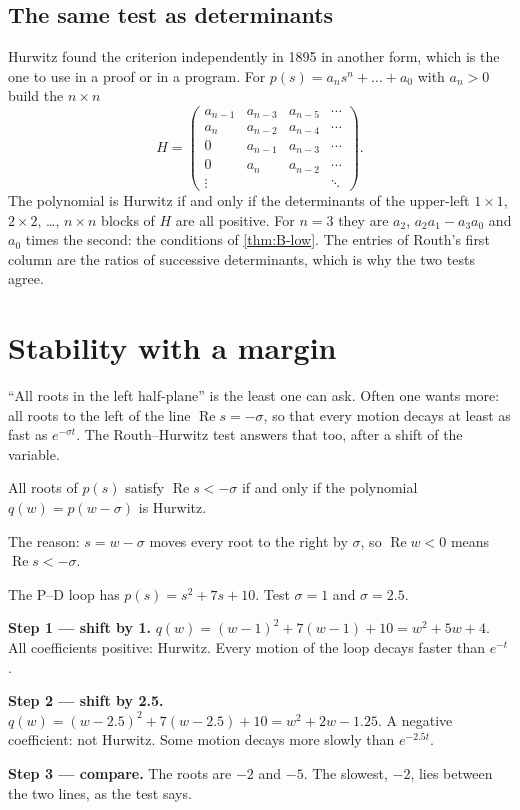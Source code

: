 \subsection{The same test as determinants}
Hurwitz found the criterion independently in 1895 in another form, which is the one to use in a proof or in a program. For $p(s) = a_ns^n + \dots + a_0$ with $a_n > 0$ build the $n \times n$ 
\begin{equation}
  H = \begin{pmatrix}
    a_{n-1} & a_{n-3} & a_{n-5} & \cdots\\
    a_n & a_{n-2} & a_{n-4} & \cdots\\
    0 & a_{n-1} & a_{n-3} & \cdots\\
    0 & a_n & a_{n-2} & \cdots\\
    \vdots & & & \ddots
  \end{pmatrix}.
\end{equation}
The polynomial is Hurwitz if and only if the determinants of the upper-left $1 \times 1$, $2 \times 2$, \dots, $n \times n$ blocks of $H$ are all positive. For $n = 3$ they are $a_2$, $a_2a_1 - a_3a_0$ and $a_0$ times the second: the conditions of \cref{thm:B-low}. The entries of Routh's first column are the ratios of successive determinants, which is why the two tests agree.

\section{Stability with a margin}

\enquote{All roots in the left half-plane} is the least one can ask. Often one wants more: all roots to the left of the line $\operatorname{Re}s = -\sigma$, so that every motion decays at least as fast as $e^{-\sigma t}$. The Routh–Hurwitz test answers that too, after a shift of the variable.

\begin{result}
All roots of $p(s)$ satisfy $\operatorname{Re}s < -\sigma$ if and only if the polynomial $q(w) = p(w - \sigma)$ is Hurwitz.
\end{result}

The reason: $s = w - \sigma$ moves every root to the right by $\sigma$, so $\operatorname{Re}w < 0$ means $\operatorname{Re}s < -\sigma$.

\begin{example}
\label{ex:B-shift}
The P–D loop has $p(s) = s^2 + 7s + 10$. Test $\sigma = 1$ and $\sigma = 2.5$.

\textbf{Step 1 — shift by 1.} $q(w) = (w - 1)^2 + 7(w - 1) + 10 = w^2 + 5w + 4$. All coefficients positive: Hurwitz. Every motion of the loop decays faster than $e^{-t}$.

\textbf{Step 2 — shift by 2.5.} $q(w) = (w - 2.5)^2 + 7(w - 2.5) + 10 = w^2 + 2w - 1.25$. A negative coefficient: not Hurwitz. Some motion decays more slowly than $e^{-2.5t}$.

\textbf{Step 3 — compare.} The roots are $-2$ and $-5$. The slowest, $-2$, lies between the two lines, as the test says.
\end{example}

